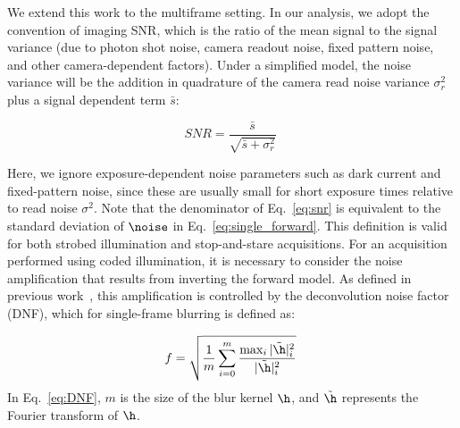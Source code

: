 We extend this work to the multiframe setting.
In our analysis, we adopt the convention of imaging SNR, which is the ratio of the mean signal to the signal variance (due to photon shot noise, camera readout noise, fixed pattern noise, and other camera-dependent factors). Under a simplified model, the noise variance will be the addition in quadrature of the camera read noise variance $\sigma^2_{r}$ plus a signal dependent term $\bar{s}$:

\begin{equation}
    \label{eq:snr}
    SNR = \frac{\bar{s}}{\sqrt{\bar{s} + \sigma^2_{r}}}\;
\end{equation}

Here, we ignore exposure-dependent noise parameters such as dark current and fixed-pattern noise, since these are usually small for short exposure times relative to read noise $\sigma^2$. Note that the denominator of Eq.~\ref{eq:snr} is equivalent to the standard deviation of $\noise$ in Eq.~\ref{eq:single_forward}. This definition is valid for both strobed illumination and stop-and-stare acquisitions. For an acquisition performed using coded illumination, it is necessary to consider the noise amplification that results from inverting the forward model. As defined in previous work~\cite{agrawal2009optimal}, this amplification is controlled by the deconvolution noise factor (DNF), which for single-frame blurring is defined as:

\begin{equation} \label{eq:DNF}
f = \sqrt{\frac{1}{m} \sum_{i=0}^m \frac{\max_i{|\tilde{\h}|_i^2}}{|\tilde{\h}|_i^2}}\:
\end{equation}
In Eq.~\ref{eq:DNF}, $m$ is the size of the blur kernel $\h$, and $\tilde{\h}$ represents the Fourier transform of $\h$. %


